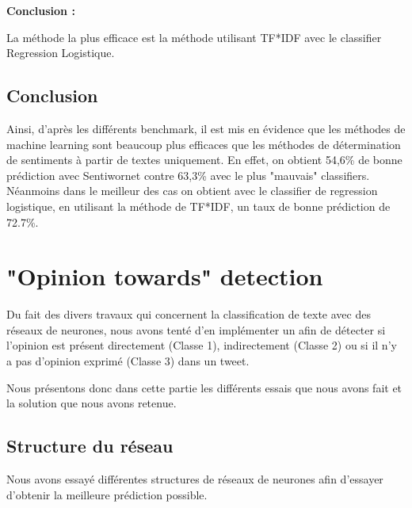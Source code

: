 \par \textbf{Conclusion :} \\
\par La méthode la plus efficace est la méthode utilisant TF*IDF avec le classifier Regression Logistique. \\


\subsection{Conclusion}

\par Ainsi, d'après les différents benchmark, il est mis en évidence que les méthodes de machine learning sont beaucoup plus efficaces que les méthodes de détermination de sentiments à partir de textes uniquement. En effet, on obtient 54,6\% de bonne prédiction avec Sentiwornet contre 63,3\% avec le plus "mauvais" classifiers. Néanmoins dans le meilleur des cas on obtient avec le classifier de regression logistique, en utilisant la méthode de TF*IDF, un taux de bonne prédiction de 72.7\%.

 
\section{"Opinion towards" detection}

\par Du fait des divers travaux qui concernent la classification de texte avec des réseaux de neurones\cite{cnn}\cite{rnn}, nous avons tenté d'en implémenter un afin de détecter si l'opinion est présent directement (Classe 1), indirectement (Classe 2) ou si il n'y a pas d'opinion exprimé (Classe 3) dans un tweet.

\par Nous présentons donc dans cette partie les différents essais que nous avons fait et la solution que nous avons retenue.

\subsection{Structure du réseau}

\par Nous avons essayé différentes structures de réseaux de neurones afin d'essayer d'obtenir la meilleure prédiction possible.

